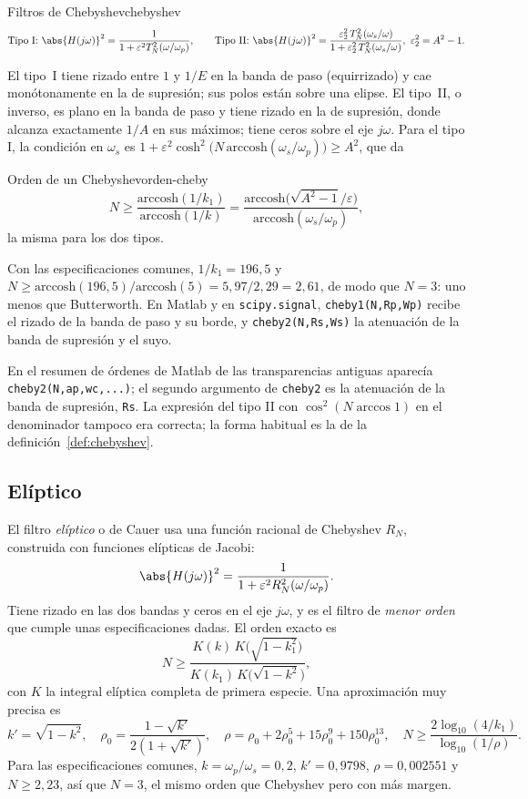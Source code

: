 \documentclass[11pt,a4paper]{scrartcl}
\begin{document}
\begin{definicion}{Filtros de Chebyshev}{chebyshev}
  \[
    \text{Tipo I: }\abs{H(j\omega)}^2=\frac{1}{1+\varepsilon^2T_N^2(\omega/\omega_p)},\qquad
    \text{Tipo II: }\abs{H(j\omega)}^2=\frac{\varepsilon_2^2\,T_N^2(\omega_s/\omega)}{1+\varepsilon_2^2\,T_N^2(\omega_s/\omega)},\ \varepsilon_2^2=A^2-1.
  \]
\end{definicion}

El tipo~I tiene rizado entre $1$ y $1/E$ en la banda de paso (equirrizado) y cae monótonamente en la de supresión; sus polos están sobre una elipse. El tipo~II, o inverso, es plano en la banda de paso y tiene rizado en la de supresión, donde alcanza exactamente $1/A$ en sus máximos; tiene ceros sobre el eje $j\omega$. Para el tipo I, la condición en $\omega_s$ es $1+\varepsilon^2\cosh^2\big(N\,\mathrm{arccosh}(\omega_s/\omega_p)\big)\ge A^2$, que da

\begin{propiedad}{Orden de un Chebyshev}{orden-cheby}
  \[
    N\ge\frac{\mathrm{arccosh}(1/k_1)}{\mathrm{arccosh}(1/k)}=\frac{\mathrm{arccosh}\big(\sqrt{A^2-1}/\varepsilon\big)}{\mathrm{arccosh}(\omega_s/\omega_p)},
  \]
  la misma para los dos tipos.
\end{propiedad}

Con las especificaciones comunes, $1/k_1=196{,}5$ y $N\ge\mathrm{arccosh}(196{,}5)/\mathrm{arccosh}(5)=5{,}97/2{,}29=2{,}61$, de modo que $N=3$: uno menos que Butterworth. En Matlab y en \texttt{scipy.signal}, \texttt{cheby1(N,Rp,Wp)} recibe el rizado de la banda de paso y su borde, y \texttt{cheby2(N,Rs,Ws)} la atenuación de la banda de supresión y el suyo.

\begin{errata}
  En el resumen de órdenes de Matlab de las transparencias antiguas aparecía \texttt{cheby2(N,ap,wc,...)}; el segundo argumento de \texttt{cheby2} es la atenuación de la banda de supresión, \texttt{Rs}. La expresión del tipo II con $\cos^2(N\arccos1)$ en el denominador tampoco era correcta; la forma habitual es la de la definición~\ref{def:chebyshev}.
\end{errata}

\subsection{Elíptico}

El filtro \emph{elíptico} o de Cauer usa una función racional de Chebyshev $R_N$, construida con funciones elípticas de Jacobi:
\[
  \abs{H(j\omega)}^2=\frac{1}{1+\varepsilon^2R_N^2(\omega/\omega_p)}.
\]
Tiene rizado en las dos bandas y ceros en el eje $j\omega$, y es el filtro de \emph{menor orden} que cumple unas especificaciones dadas. El orden exacto es
\[
  N\ge\frac{K(k)\,K\big(\sqrt{1-k_1^2}\big)}{K(k_1)\,K\big(\sqrt{1-k^2}\big)},
\]
con $K$ la integral elíptica completa de primera especie. Una aproximación muy precisa es
\[
  k'=\sqrt{1-k^2},\quad \rho_0=\frac{1-\sqrt{k'}}{2(1+\sqrt{k'})},\quad \rho=\rho_0+2\rho_0^5+15\rho_0^9+150\rho_0^{13},\quad N\ge\frac{2\log_{10}(4/k_1)}{\log_{10}(1/\rho)}.
\]
Para las especificaciones comunes, $k=\omega_p/\omega_s=0{,}2$, $k'=0{,}9798$, $\rho=0{,}002551$ y $N\ge2{,}23$, así que $N=3$, el mismo orden que Chebyshev pero con más margen.
\end{document}
